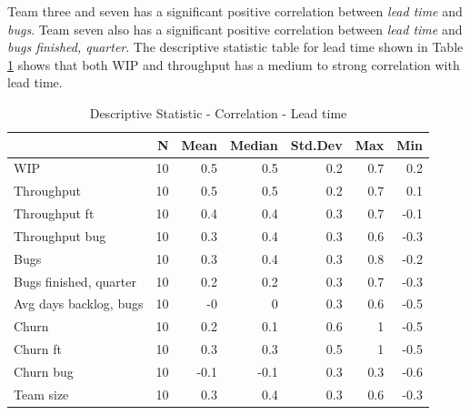 \documentclass[UKenglish]{ifimaster}  %
\begin{document}
Team three and seven has a significant positive correlation between \textit{lead time} and \textit{bugs}. Team seven also has a significant positive correlation between \textit{lead time} and \textit{bugs finished, quarter}. The descriptive statistic table for lead time shown in Table \ref{DS:corr:LT} shows that both WIP and throughput has a medium to strong correlation with lead time. 
\begin{table}[!htbp]
 \centering
 \begin{tabular}{ | l | r | r | r | r | r | r | }
 \hline
 & \bf{N} & \bf{Mean} & \bf{Median} & \bf{Std.Dev} & \bf{Max} & \bf{Min} \\ \hline
WIP  & 10 & 0.5 & 0.5 & 0.2 & 0.7 & 0.2\\ \hline
Throughput  & 10 & 0.5 & 0.5 & 0.2 & 0.7 & 0.1\\ \hline
Throughput ft  & 10 & 0.4 & 0.4 & 0.3 & 0.7 & -0.1\\ \hline
Throughput bug  & 10 & 0.3 & 0.4 & 0.3 & 0.6 & -0.3\\ \hline
Bugs  & 10 & 0.3 & 0.4 & 0.3 & 0.8 & -0.2\\ \hline
Bugs finished, quarter  & 10 & 0.2 & 0.2 & 0.3 & 0.7 & -0.3\\ \hline
Avg days backlog, bugs  & 10 & -0 & 0 & 0.3 & 0.6 & -0.5\\ \hline
Churn  & 10 & 0.2 & 0.1 & 0.6 & 1 & -0.5\\ \hline
Churn ft  & 10 & 0.3 & 0.3 & 0.5 & 1 & -0.5\\ \hline
Churn bug  & 10 & -0.1 & -0.1 & 0.3 & 0.3 & -0.6\\ \hline
Team size  & 10 & 0.3 & 0.4 & 0.3 & 0.6 & -0.3\\ \hline
\end{tabular}
 \caption{Descriptive Statistic - Correlation - Lead time}
 \label{DS:corr:LT}
 \end{table}
\end{document}
